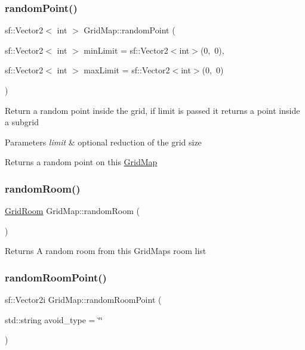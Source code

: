 \subsubsection{\texorpdfstring{random\+Point()}{randomPoint()}}
{\footnotesize\ttfamily sf\+::\+Vector2$<$ int $>$ Grid\+Map\+::random\+Point (\begin{DoxyParamCaption}\item[{sf\+::\+Vector2$<$ int $>$}]{min\+Limit = {\ttfamily sf\+:\+:Vector2$<$int$>$(0,~0)},  }\item[{sf\+::\+Vector2$<$ int $>$}]{max\+Limit = {\ttfamily sf\+:\+:Vector2$<$int$>$(0,~0)} }\end{DoxyParamCaption})}

Return a random point inside the grid, if limit is passed it returns a point inside a subgrid


\begin{DoxyParams}{Parameters}
{\em limit} & optional reduction of the grid size\\
\hline
\end{DoxyParams}
\begin{DoxyReturn}{Returns}
a random point on this \hyperlink{classGridMap}{Grid\+Map} 
\end{DoxyReturn}
\mbox{\label{classGridMap_af9fe47e5d5cdcceb5f1ebe2913be5b92}} 
\subsubsection{\texorpdfstring{random\+Room()}{randomRoom()}}
{\footnotesize\ttfamily \hyperlink{classGridRoom}{Grid\+Room} Grid\+Map\+::random\+Room (\begin{DoxyParamCaption}{ }\end{DoxyParamCaption})}

\begin{DoxyReturn}{Returns}
A random room from this Grid\+Maps room list 
\end{DoxyReturn}
\mbox{\label{classGridMap_ae44e3afa62e46f8027c39cdf5d1b93e6}} 
\subsubsection{\texorpdfstring{random\+Room\+Point()}{randomRoomPoint()}}
{\footnotesize\ttfamily sf\+::\+Vector2i Grid\+Map\+::random\+Room\+Point (\begin{DoxyParamCaption}\item[{std\+::string}]{avoid\+\_\+type = {\ttfamily \char`\"{}\char`\"{}} }\end{DoxyParamCaption})}

